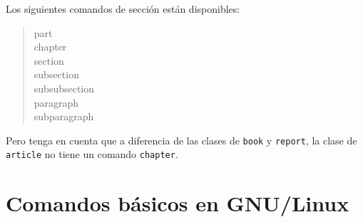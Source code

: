 \documentclass[11pt, oneside]{book}
\begin{document}
Los siguientes comandos de sección están disponibles:
\begin{quote}
 part \\
 chapter \\%
 section \\
 subsection \\
 subsubsection \\
 paragraph \\
 subparagraph
\end{quote}%

Pero tenga en cuenta que  a diferencia de las clases de \texttt{book} y \texttt{report}, la clase de \texttt{article} no tiene un comando \texttt{chapter}.

\chapter{Comandos básicos en GNU/Linux}
\lipsum[1]
\end{document}
